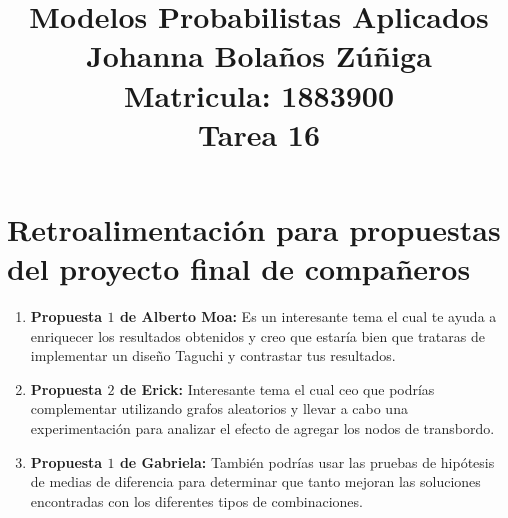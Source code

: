 \documentclass{article}
\title{
\centering
Modelos Probabilistas Aplicados \\
Johanna Bolaños Zúñiga \\
Matricula: 1883900\\
Tarea 16
}
\date{}
\begin{document}
\maketitle

\section{Retroalimentación para propuestas del proyecto final de compañeros }

\begin{enumerate}
    \item \textbf{Propuesta $1$ de Alberto Moa:} Es un interesante tema el cual te ayuda a enriquecer los resultados obtenidos y creo que estaría bien que trataras de implementar un diseño Taguchi y contrastar tus resultados.
    \item \textbf{Propuesta $2$ de Erick:} Interesante tema el cual ceo que podrías complementar utilizando grafos aleatorios y llevar a cabo una experimentación para analizar el efecto de agregar los nodos de transbordo.
    \item \textbf{Propuesta $1$ de Gabriela:} También podrías usar las pruebas de hipótesis de medias de diferencia para determinar que tanto mejoran las soluciones encontradas con los diferentes tipos de combinaciones.
\end{enumerate}


%
%
\end{document}
